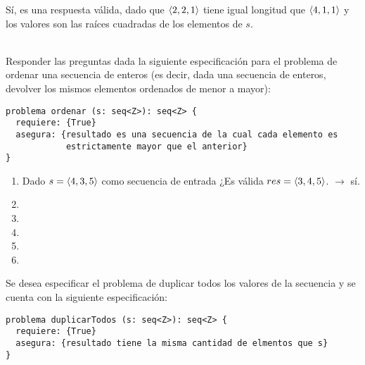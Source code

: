 \documentclass[12pt,a4paper,spanish]{article}
\begin{document}
\begin{enumerate}[label=\arabic*.]
	      Sí, es una respuesta válida, dado que $\langle2, 2, 1\rangle$ tiene igual longitud que $\langle4,1,1\rangle$ y los valores son las raíces cuadradas
	      de los elementos de $s$.\\
	      \\

\end{enumerate}

\ejercicio

Responder las preguntas dada la siguiente especificación para el problema de ordenar una secuencia de enteros (es decir, dada una secuencia de enteros,
devolver los mismos elementos ordenados de menor a mayor):\\

\begin{verbatim}
problema ordenar (s: seq<Z>): seq<Z> {
  requiere: {True}
  asegura: {resultado es una secuencia de la cual cada elemento es
            estrictamente mayor que el anterior}
} 
\end{verbatim}

\begin{enumerate}[label=\alph*)]
	\item  Dado $s = \langle4,3,5\rangle$ como secuencia de entrada ¿Es válida $res = \langle3,4,5\rangle$. $\to$ sí.
	\item \hacer
	\item \hacer
	\item \hacer
	\item \hacer
	\item \hacer
\end{enumerate}

\ejercicio

Se desea especificar el problema de duplicar todos los valores de la secuencia y se cuenta con la siguiente especificación:

\begin{verbatim}
problema duplicarTodos (s: seq<Z>): seq<Z> {
  requiere: {True}
  asegura: {resultado tiene la misma cantidad de elmentos que s}
} 
\end{verbatim}
\end{document}

